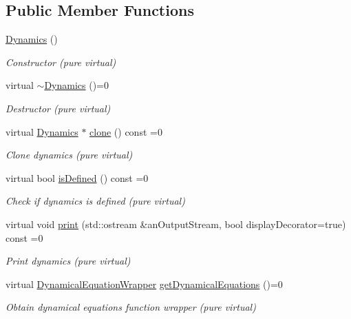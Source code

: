 \subsection*{Public Member Functions}
\begin{DoxyCompactItemize}
\item 
\hyperlink{classostk_1_1astro_1_1flight_1_1system_1_1_dynamics_ae095f36d21c5fb80059100b3f68a6034}{Dynamics} ()
\begin{DoxyCompactList}\small\item\em Constructor (pure virtual) \end{DoxyCompactList}\item 
virtual \hyperlink{classostk_1_1astro_1_1flight_1_1system_1_1_dynamics_afad57df27ce6737316f0c1102e1919ae}{$\sim$\+Dynamics} ()=0
\begin{DoxyCompactList}\small\item\em Destructor (pure virtual) \end{DoxyCompactList}\item 
virtual \hyperlink{classostk_1_1astro_1_1flight_1_1system_1_1_dynamics}{Dynamics} $\ast$ \hyperlink{classostk_1_1astro_1_1flight_1_1system_1_1_dynamics_a7de1a8ce101f3cee59fd624b487de5be}{clone} () const =0
\begin{DoxyCompactList}\small\item\em Clone dynamics (pure virtual) \end{DoxyCompactList}\item 
virtual bool \hyperlink{classostk_1_1astro_1_1flight_1_1system_1_1_dynamics_a13160e001990a6ce8db807e39b8f97df}{is\+Defined} () const =0
\begin{DoxyCompactList}\small\item\em Check if dynamics is defined (pure virtual) \end{DoxyCompactList}\item 
virtual void \hyperlink{classostk_1_1astro_1_1flight_1_1system_1_1_dynamics_aa3fdfebb45a96bb0c6405c750e1c6d30}{print} (std\+::ostream \&an\+Output\+Stream, bool display\+Decorator=true) const =0
\begin{DoxyCompactList}\small\item\em Print dynamics (pure virtual) \end{DoxyCompactList}\item 
virtual \hyperlink{classostk_1_1astro_1_1flight_1_1system_1_1_dynamics_a9b14f4fbea6fe1e96af9e71545d4c77e}{Dynamical\+Equation\+Wrapper} \hyperlink{classostk_1_1astro_1_1flight_1_1system_1_1_dynamics_a2001816629758bad7e960af54e87ddaa}{get\+Dynamical\+Equations} ()=0
\begin{DoxyCompactList}\small\item\em Obtain dynamical equations function wrapper (pure virtual) \end{DoxyCompactList}\end{DoxyCompactItemize}


